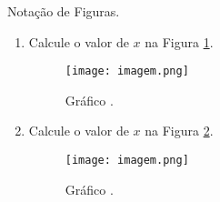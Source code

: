 \documentclass[a4paper, 12pt]{article}
\begin{document}
Notação de Figuras.
  \begin{enumerate}
    \item Calcule o valor de $x$ na Figura \ref{rotulo}.

      \begin{figure}[H]
        \centering
        \texttt{[image: imagem.png]}
        \caption{Gráfico .}
        \label{rotulo}
      \end{figure}

    \item Calcule o valor de $x$ na Figura \ref{meu-rotulo}.

      \begin{figure}[H]
        \centering
        \texttt{[image: imagem.png]}
        \caption{Gráfico .}
        \label{meu-rotulo}
      \end{figure}

  \end{enumerate}
\end{document}
